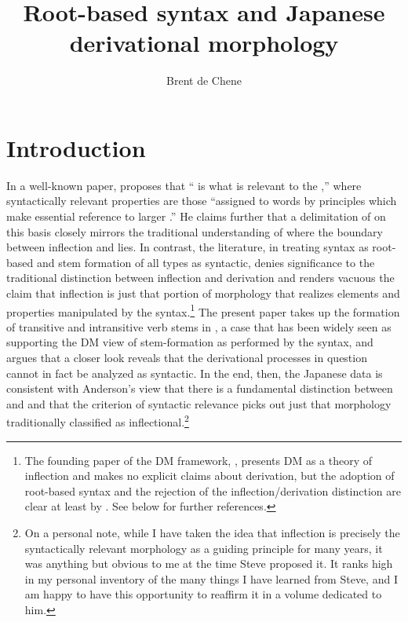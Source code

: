 \documentclass[output=paper,
modfonts
]{LSP/langsci}
\title{Root-based syntax and Japanese derivational morphology}
\author{%
Brent de Chene\affiliation{Waseda University}
}
\begin{document}
\maketitle

\section{Introduction}

In a well-known paper, \citet[587]{anderson1982a} proposes that `` is what is relevant to the ,'' where syntactically
relevant properties are those ``assigned to words by principles which
make essential reference to larger .'' He claims
further that a delimitation of  on this basis closely mirrors
the traditional understanding of where the boundary between inflection
and  lies. In contrast, the  literature,
in treating syntax as root-based and stem formation of all types as
syntactic, denies significance to the traditional distinction between
inflection and derivation and renders vacuous the claim that inflection
is just that portion of morphology that realizes elements and properties
manipulated by the syntax.\footnote{The founding paper of the DM
  framework, \citet{halle1993a}, presents DM as a theory of
  inflection and makes no explicit claims about derivation, but the
  adoption of root-based syntax and the rejection of the
  inflection/derivation distinction are clear at least by \citet{marantz1997a,marantz2001a}. See below for further references.} The present paper
takes up the formation of transitive and intransitive verb stems in
, a case that has been widely seen as supporting the DM view of
stem-formation as performed by the syntax, and argues that a closer look
reveals that the derivational processes in question cannot in fact be
analyzed as syntactic. In the end, then, the Japanese data is consistent
with Anderson's view that there is a fundamental distinction between
 and  and that the criterion of syntactic relevance
picks out just that morphology traditionally classified as
inflectional.\footnote{On a personal note, while I have taken the idea
  that inflection is precisely the syntactically relevant morphology as
  a guiding principle for many years, it was anything but obvious to me
  at the time Steve proposed it. It ranks high in my personal inventory
  of the many things I have learned from Steve, and I am happy to have
  this opportunity to reaffirm it in a volume dedicated to him.}
\end{document}
